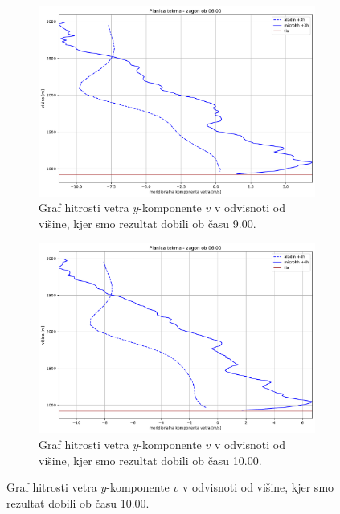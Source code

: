 \documentclass[mat2, tisk]{fmfdelo}
\begin{document}
\begin{figure}[h!]
  \centering
  \begin{subfigure}[b]{1\textwidth}
    \centering
    \includegraphics[width=\textwidth]{rezultati/v_planica_long_3.pdf}
    \caption{Graf hitrosti vetra $y$-komponente $v$ v odvisnoti od višine, kjer smo 
    rezultat dobili ob času 9.00.}
    \label{fig:planica}
  \end{subfigure}\hfill
  \begin{subfigure}[b]{1\textwidth}
    \centering
    \includegraphics[width=\textwidth]{rezultati/v_planica_long_4.pdf} 
    \caption{Graf hitrosti vetra $y$-komponente $v$ v odvisnoti od višine, kjer smo 
    rezultat dobili ob času 10.00.}
    \label{fig:barje}
  \end{subfigure}
  \label{fig:orography_sidebyside}
\end{figure}
\end{document}
